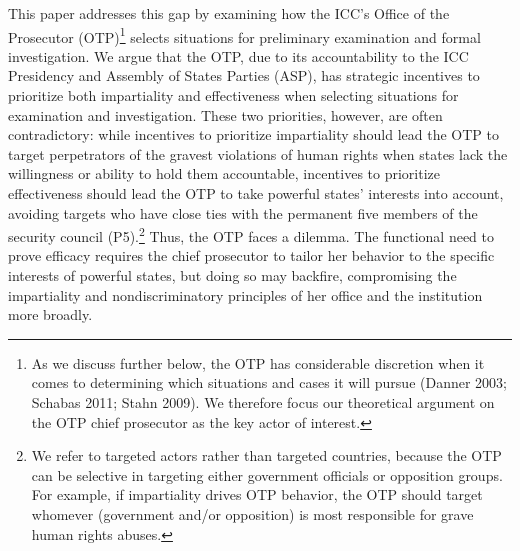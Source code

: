This paper addresses this gap by examining how the ICC's Office of the Prosecutor (OTP)\footnote{As we discuss further below, the OTP has considerable discretion when it comes to determining which situations and cases it will pursue (Danner 2003; Schabas 2011; Stahn 2009). We therefore focus our theoretical argument on the OTP chief prosecutor as the key actor of interest.} selects situations for preliminary examination and formal investigation. We argue that the OTP, due to its accountability to the ICC Presidency and Assembly of States Parties (ASP), has strategic incentives to prioritize both impartiality and effectiveness when selecting situations for examination and investigation. These two priorities, however, are often contradictory: while incentives to prioritize impartiality should lead the OTP to target perpetrators of the gravest violations of human rights when states lack the willingness or ability to hold them accountable, incentives to prioritize effectiveness should lead the OTP to take powerful states' interests into account, avoiding targets who have close ties with the permanent five members of the security council (P5).\footnote{We refer to targeted actors rather than targeted countries, because the OTP can be selective in targeting either government officials or opposition groups. For example, if impartiality drives OTP behavior, the OTP should target whomever (government and/or opposition) is most responsible for grave human rights abuses.} %
Thus, the OTP faces a dilemma. The functional need to prove efficacy requires the chief prosecutor to tailor her behavior to the specific interests of powerful states, but doing so may backfire, compromising the impartiality and nondiscriminatory principles of her office and the institution more broadly.

